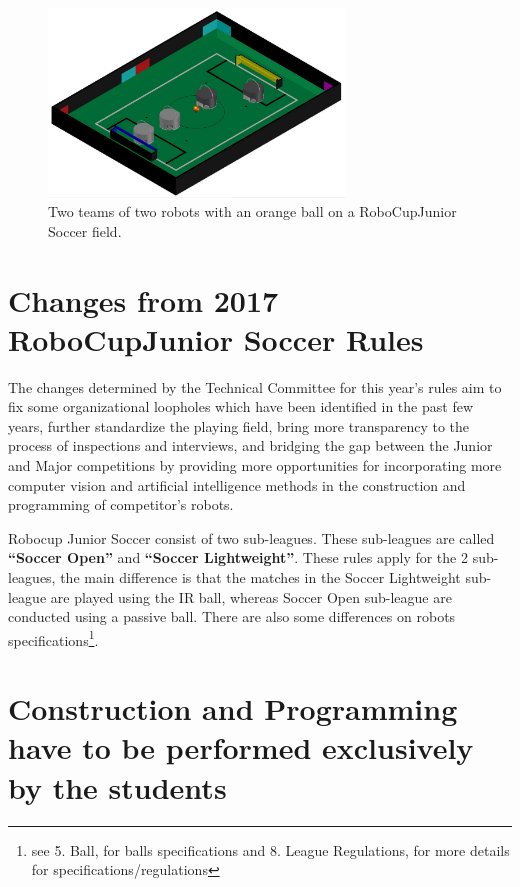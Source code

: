 \documentclass{article}
\begin{document}
\begin{figure}[H]
    \centering
    \includegraphics[width=0.7\textwidth]{media/image1.jpeg}
    \caption{Two teams of two robots with an orange ball on a RoboCupJunior
        Soccer field.}
    \label{fig:name}
\end{figure}



\section*{Changes from 2017 RoboCupJunior Soccer Rules}

The changes determined by the Technical Committee for this year's rules aim to
fix some organizational loopholes which have been identified in the past few
years, further standardize the playing field, bring more transparency to the
process of inspections and interviews, and bridging the gap between the Junior
and Major competitions by providing more opportunities for incorporating more
computer vision and artificial intelligence methods in the construction and
programming of competitor's robots.

Robocup Junior Soccer consist of two sub-leagues. These sub-leagues are called
\textbf{``Soccer Open''} and \textbf{``Soccer Lightweight''}. These rules apply
for the 2 sub-leagues, the main difference is that the matches in the Soccer
Lightweight sub-league are played using the IR ball, whereas Soccer Open
sub-league are conducted using a passive ball. There are also some differences
on robots specifications\footnote{see 5. Ball, for balls specifications and 8. League
Regulations, for more details for specifications/regulations}.

\listofchanges

\section*{Construction and Programming have to be performed exclusively by the students}
\end{document}
